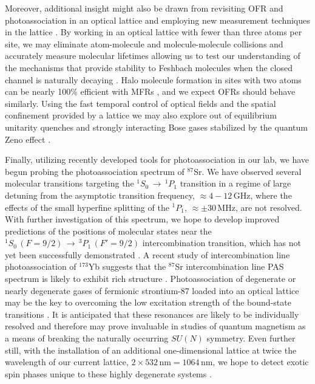 Moreover, additional insight might also be drawn from revisiting OFR and photoassociation in an optical lattice and employing new measurement techniques in the lattice \cite{Taie2016}. 
By working in an optical lattice with fewer than three atoms per site, we may eliminate atom-molecule and molecule-molecule collisions and accurately measure molecular lifetimes \cite{Thalhammer2006,lsb08} allowing us to test our understanding of the mechanisms that provide stability to Feshbach molecules when the closed channel is naturally decaying \cite{Kohler2005}.
Halo molecule formation in sites with two atoms can be nearly 100\% efficient with MFRs \cite{Mies2000,Chin2010}, and we expect OFRs should behave similarly.
Using the fast temporal control of optical fields and the spatial confinement provided by a lattice we may also explore out of equilibrium unitarity quenches \cite{Makotyn2014} and strongly interacting Bose gases stabilized by the quantum Zeno effect \cite{fgr01,Zhu2014,Daley2009,Syassen2008}.

Finally, utilizing recently developed tools for photoassociation in our lab, we have begun probing the photoassociation spectrum of $^{87}$Sr.
We have observed several molecular transitions targeting the $^1S_0\,\rightarrow\,^1P_1$ transition in a regime of large detuning from the asymptotic transition frequency, $\approx 4-12\,$GHz, where the effects of the small hyperfine splitting of the $^1P_1$, $\approx \pm30\,$MHz, are not resolved.
With further investigation of this spectrum, we hope to develop improved predictions of the positions of molecular states near the $^1S_0\,(F=9/2)\,\rightarrow\,^3P_1\,(F'=9/2)$ intercombination transition, which has not yet been successfully demonstrated \cite{Reschovsky}.
A recent study of intercombination line photoassociation of $^{173}$Yb suggests that the $^{87}$Sr intercombination line PAS spectrum is likely to exhibit rich structure \cite{Han2018a, Franchi2017,Kim2016}.
Photoassociation of degenerate or nearly degenerate gases of fermionic strontium-87 loaded into an optical lattice may be the key to overcoming the low excitation strength of the bound-state transitions \cite{bhm12,tys12}.
It is anticipated that these resonances are likely to be individually resolved \cite{Han2018a} and therefore may prove invaluable in studies of quantum magnetism as a means of breaking the naturally occurring $SU(N)$ symmetry.
Even further still, with the installation of an additional one-dimensional lattice at twice the wavelength of our current lattice, $2\times 532\,\text{nm} = 1064\,$nm, we hope to detect exotic spin phases unique to these highly degenerate systems \cite{Beverland2016,cre14,Chen2015, pbl08, Gorshkov2010,Scazza2014, ftc07,Cappellini2014}. 

